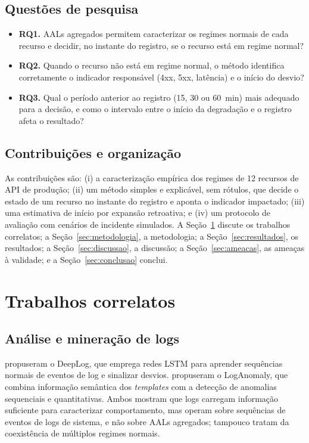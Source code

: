 \documentclass[sigconf,nonacm]{acmart}
\begin{document}
\subsection{Questões de pesquisa}
\begin{itemize}
  \item \textbf{RQ1.} AALs agregados permitem caracterizar os regimes normais de cada recurso e decidir, no instante do registro, se o recurso está em regime normal?
  \item \textbf{RQ2.} Quando o recurso não está em regime normal, o método identifica corretamente o indicador responsável (4xx, 5xx, latência) e o início do desvio?
  \item \textbf{RQ3.} Qual o período anterior ao registro (15, 30 ou 60~min) mais adequado para a decisão, e como o intervalo entre o início da degradação e o registro afeta o resultado?
\end{itemize}

\subsection{Contribuições e organização}
As contribuições são: (i) a caracterização empírica dos regimes de 12 recursos de API de produção; (ii) um método simples e explicável, sem rótulos, que decide o estado de um recurso no instante do registro e aponta o indicador impactado; (iii) uma estimativa de início por expansão retroativa; e (iv) um protocolo de avaliação com cenários de incidente simulados. A Seção~\ref{sec:correlatos} discute os trabalhos correlatos; a Seção~\ref{sec:metodologia}, a metodologia; a Seção~\ref{sec:resultados}, os resultados; a Seção~\ref{sec:discussao}, a discussão; a Seção~\ref{sec:ameacas}, as ameaças à validade; e a Seção~\ref{sec:conclusao} conclui.

\section{Trabalhos correlatos}\label{sec:correlatos}

\subsection{Análise e mineração de logs}
\citet{du2017deeplog} propuseram o DeepLog, que emprega redes LSTM para aprender sequências normais de eventos de log e sinalizar desvios. \citet{meng2019loganomaly} propuseram o LogAnomaly, que combina informação semântica dos \emph{templates} com a detecção de anomalias sequenciais e quantitativas. Ambos mostram que logs carregam informação suficiente para caracterizar comportamento, mas operam sobre sequências de eventos de logs de sistema, e não sobre AALs agregados; tampouco tratam da coexistência de múltiplos regimes normais.
\end{document}
